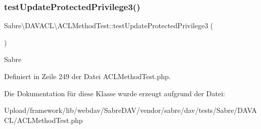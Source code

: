 \subsubsection{\texorpdfstring{test\+Update\+Protected\+Privilege3()}{testUpdateProtectedPrivilege3()}}
{\footnotesize\ttfamily Sabre\textbackslash{}\+D\+A\+V\+A\+C\+L\textbackslash{}\+A\+C\+L\+Method\+Test\+::test\+Update\+Protected\+Privilege3 (\begin{DoxyParamCaption}{ }\end{DoxyParamCaption})}

Sabre 

Definiert in Zeile 249 der Datei A\+C\+L\+Method\+Test.\+php.



Die Dokumentation für diese Klasse wurde erzeugt aufgrund der Datei\+:\begin{DoxyCompactItemize}
\item 
Upload/framework/lib/webdav/\+Sabre\+D\+A\+V/vendor/sabre/dav/tests/\+Sabre/\+D\+A\+V\+A\+C\+L/A\+C\+L\+Method\+Test.\+php\end{DoxyCompactItemize}
